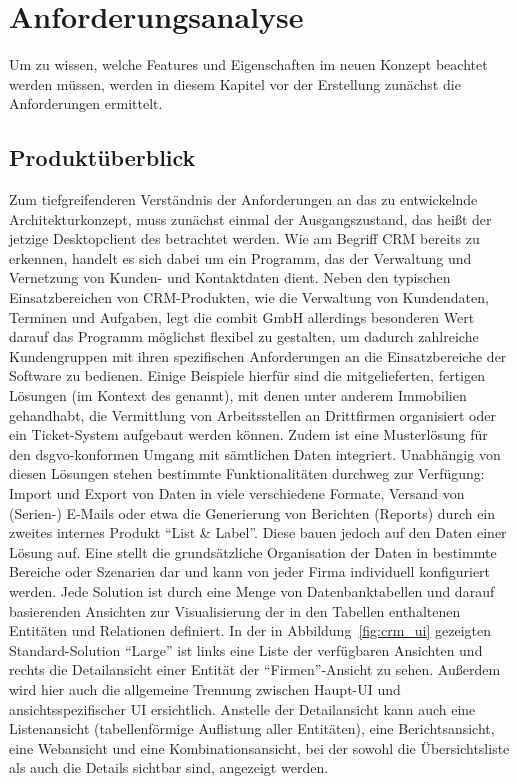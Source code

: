\chapter{Anforderungsanalyse}\label{chap:requirements}
Um zu wissen, welche Features und Eigenschaften im neuen Konzept beachtet werden müssen, werden in diesem Kapitel vor der Erstellung zunächst die Anforderungen ermittelt.

\section{Produktüberblick}\label{sec:product_overview}
Zum tiefgreifenderen Verständnis der Anforderungen an das zu entwickelnde Architekturkonzept, muss zunächst einmal der Ausgangszustand, das heißt der jetzige Desktopclient des  betrachtet werden. Wie am Begriff \gls{CRM} bereits zu erkennen, handelt es sich dabei um ein Programm, das der Verwaltung und Vernetzung von Kunden- und Kontaktdaten dient. Neben den typischen Einsatzbereichen von \gls{CRM}-Produkten, wie die Verwaltung von Kundendaten, Terminen und Aufgaben, legt die combit GmbH allerdings besonderen Wert darauf das Programm möglichst flexibel zu gestalten, um dadurch zahlreiche Kundengruppen mit ihren spezifischen Anforderungen an die Einsatzbereiche der Software zu bedienen. Einige Beispiele hierfür sind die mitgelieferten, fertigen Lösungen (im Kontext des   genannt), mit denen unter anderem Immobilien gehandhabt, die Vermittlung von Arbeitsstellen an Drittfirmen organisiert oder ein Ticket-System aufgebaut werden können. Zudem ist eine Musterlösung für den \gls{dsgvo}-konformen Umgang mit sämtlichen Daten integriert. Unabhängig von diesen Lösungen stehen bestimmte Funktionalitäten durchweg zur Verfügung: Import und Export von Daten in viele verschiedene Formate, Versand von (Serien-) E-Mails oder etwa die Generierung von Berichten (Reports) durch ein zweites internes Produkt ``List \& Label''. Diese bauen jedoch auf den Daten einer Lösung auf.
Eine  stellt die grundsätzliche Organisation der Daten in bestimmte Bereiche oder Szenarien dar und kann von jeder Firma individuell konfiguriert werden. Jede Solution ist durch eine Menge von Datenbanktabellen und darauf basierenden Ansichten zur Visualisierung der in den Tabellen enthaltenen Entitäten und Relationen definiert. In der in Abbildung~\ref{fig:crm_ui} gezeigten Standard-Solution ``Large'' ist links eine Liste der verfügbaren Ansichten und rechts die Detailansicht einer Entität der ``Firmen''-Ansicht zu sehen. Außerdem wird hier auch die allgemeine Trennung zwischen Haupt-UI und ansichtsspezifischer UI ersichtlich. Anstelle der Detailansicht kann auch eine Listenansicht (tabellenförmige Auflistung aller Entitäten), eine Berichtsansicht, eine Webansicht und eine Kombinationsansicht, bei der sowohl die Übersichtsliste als auch die Details sichtbar sind, angezeigt werden.

